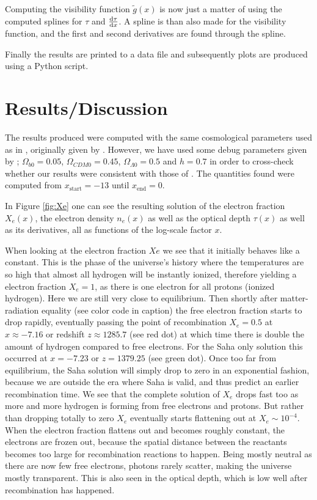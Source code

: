 \documentclass[twocolumn]{aastex62}
\begin{document}
Computing the visibility function $\tilde{g}(x)$ is now just a matter of using the computed splines for $\tau$ and $\dv{\tau}{x}$. A spline is than also made for the visibility function, and the first and second derivatives are found through the spline. 

Finally the results are printed to a data file and subsequently plots are produced using a Python script.

\section{Results/Discussion}\label{sec:Results}
The results produced were computed with the same cosmological parameters used as in \cite{stutzer:2020}, originally given by \cite{callin:2006}. However, we have used some debug parameters given by \cite{winther:2020}; $\Omega_{b0} = 0.05$, $\Omega_{CDM0} = 0.45$, $\Omega_{\Lambda 0} = 0.5$ and $h = 0.7$ in order to cross-check whether our results were consistent with those of \cite{winther:2020}. The quantities found were computed from $x_\text{start} = -13$ until $x_\text{end} = 0$.

In Figure \ref{fig:Xe} one can see the resulting solution of the electron fraction $X_e(x)$, the electron density $n_e(x)$ as well as the optical depth $\tau(x)$ as well as its derivatives, all as functions of the log-scale factor $x$. 

When looking at the electron fraction $Xe$ we see that it initially behaves like a constant. This is the phase of the universe's history where the temperatures are so high that almost all hydrogen will be instantly ionized, therefore yielding a electron fraction $X_e = 1$, as there is one electron for all protons (ionized hydrogen). Here we are still very close to equilibrium. Then shortly after matter-radiation equality (see color code in caption) the free electron fraction starts to drop rapidly, eventually passing the point of recombination $X_e = 0.5$ at $x \approx -7.16$ or redshift $z \approx 1285.7$ (see red dot) at which time there is double the amount of hydrogen compared to free electrons. For the Saha only solution this occurred at $x = -7.23$ or $z = 1379.25$ (see green dot). Once too far from equilibrium, the Saha solution will simply drop to zero in an exponential fashion, because we are outside the era where Saha is valid, and thus predict an earlier recombination time. We see that the complete solution of $X_e$ drops fast too as more and more hydrogen is forming from free electrons and protons. But rather than dropping totally to zero $X_e$ eventually starts flattening out at $X_e \sim 10^{-4}$. When the electron fraction flattens out and becomes roughly constant, the electrons are frozen out, because the spatial distance between the reactants becomes too large for recombination reactions to happen. Being mostly neutral as there are now few free electrons, photons rarely scatter, making the universe mostly transparent. This is also seen in the optical depth, which is low well after recombination has happened.
\end{document}
